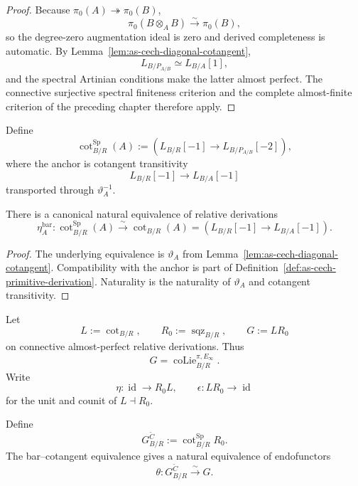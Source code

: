 \begin{proof}
Because $\pi_0(A)\twoheadrightarrow\pi_0(B)$,
\[
    \pi_0(B\otimes_A B)
    \xrightarrow{\sim}
    \pi_0(B),
\]
so the degree-zero augmentation ideal is zero and derived completeness is
automatic.  By Lemma~\ref{lem:as-cech-diagonal-cotangent},
\[
    L_{B/P_{A/B}}
    \simeq
    L_{B/A}[1],
\]
and the spectral Artinian conditions make the latter almost perfect.  The
connective surjective spectral finiteness criterion and the complete
almost-finite criterion of the preceding chapter therefore apply.
\end{proof}

\begin{definition}
\label{def:as-cech-primitive-derivation}
Define
\[
\boxed{
    \operatorname{cot}^{\mathrm{Sp}}_{B/R}(A)
    :=
    \left(
        L_{B/R}[-1]
        \longrightarrow
        L_{B/P_{A/B}}[-2]
    \right),
}
\]
where the anchor is cotangent transitivity
\[
    L_{B/R}[-1]\longrightarrow L_{B/A}[-1]
\]
transported through $\vartheta_A^{-1}$.
\end{definition}

\begin{theorem}
\label{thm:as-bar-cotangent}
There is a canonical natural equivalence of relative derivations
\[
\boxed{
    \eta_A^{\mathrm{bar}}:
    \operatorname{cot}^{\mathrm{Sp}}_{B/R}(A)
    \xrightarrow{\sim}
    \operatorname{cot}_{B/R}(A)
    =
    \left(
        L_{B/R}[-1]\to L_{B/A}[-1]
    \right).
}
\]
\end{theorem}

\begin{proof}
The underlying equivalence is $\vartheta_A$ from
Lemma~\ref{lem:as-cech-diagonal-cotangent}.  Compatibility with the anchor is
part of Definition~\ref{def:as-cech-primitive-derivation}.  Naturality is the
naturality of $\vartheta_A$ and cotangent transitivity.
\end{proof}

Let
\[
    L:=\operatorname{cot}_{B/R},
    \qquad
    R_0:=\operatorname{sqz}_{B/R},
    \qquad
    G:=LR_0
\]
on connective almost-perfect relative derivations.  Thus
\[
    G=\operatorname{coLie}^{\pi,E_\infty}_{B/R}.
\]
Write
\[
    \eta:\operatorname{id}\longrightarrow R_0L,
    \qquad
    \epsilon:LR_0\longrightarrow\operatorname{id}
\]
for the unit and counit of $L\dashv R_0$.

\begin{definition}
\label{def:as-cech-primitive-endofunctor}
Define
\[
\boxed{
    G^{\check C}_{B/R}
    :=
    \operatorname{cot}^{\mathrm{Sp}}_{B/R}R_0.
}
\]
The bar--cotangent equivalence gives a natural equivalence of endofunctors
\[
\boxed{
    \theta:
    G^{\check C}_{B/R}
    \xrightarrow{\sim}
    G.
}
\]
\end{definition}

